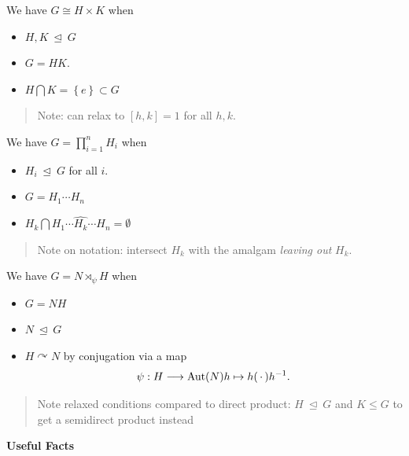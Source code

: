 We have \(G \cong H \times K\) when

\begin{itemize}
\item
  \(H, K {~\trianglelefteq~}G\)
\item
  \(G = HK\).
\item
  \(H\bigcap K = \left\{{e}\right\} \subset G\)
\end{itemize}

\begin{quote}
Note: can relax to \([h,k] = 1\) for all \(h, k\).
\end{quote}

We have \(G = \prod_{i=1}^n H_i\) when

\begin{itemize}
\item
  \(H_i {~\trianglelefteq~}G\) for all \(i\).
\item
  \(G = H_1 \cdots H_n\)
\item
  \(H_k \bigcap H_1 \cdots \widehat{H_k} \cdots H_n = \emptyset\)
\end{itemize}

\begin{quote}
Note on notation: intersect \(H_k\) with the amalgam \emph{leaving out}
\(H_k\).
\end{quote}

We have \(G = N \rtimes_\psi H\) when

\begin{itemize}
\item
  \(G = NH\)
\item
  \(N {~\trianglelefteq~}G\)
\item
  \(H \curvearrowright N\) by conjugation via a map \[  
  \psi: H \longrightarrow{\mathrm{Aut}}(N) \\
  h \mapsto h({\,\cdot\,})h^{-1}
  .\]
\end{itemize}

\begin{quote}
Note relaxed conditions compared to direct product:
\(H{~\trianglelefteq~}G\) and \(K\leq G\) to get a semidirect product
instead
\end{quote}

\textbf{Useful Facts}

